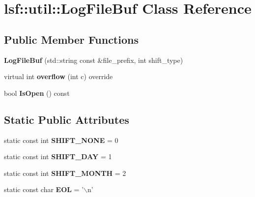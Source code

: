 \hypertarget{classlsf_1_1util_1_1LogFileBuf}{
\section{lsf::util::LogFileBuf Class Reference}
\label{classlsf_1_1util_1_1LogFileBuf}
}
\subsection*{Public Member Functions}
\begin{DoxyCompactItemize}
\item 
\hypertarget{classlsf_1_1util_1_1LogFileBuf_a99668a3f8bcb7db5b4b24c812bbdcc67}{
{\bfseries LogFileBuf} (std::string const \&file\_\-prefix, int shift\_\-type)}
\label{classlsf_1_1util_1_1LogFileBuf_a99668a3f8bcb7db5b4b24c812bbdcc67}

\item 
\hypertarget{classlsf_1_1util_1_1LogFileBuf_a124a4185f6860c7ab77e25da1aea7b3a}{
virtual int {\bfseries overflow} (int c) override}
\label{classlsf_1_1util_1_1LogFileBuf_a124a4185f6860c7ab77e25da1aea7b3a}

\item 
\hypertarget{classlsf_1_1util_1_1LogFileBuf_a507c59acfef18c258aeb8e95635c540a}{
bool {\bfseries IsOpen} () const }
\label{classlsf_1_1util_1_1LogFileBuf_a507c59acfef18c258aeb8e95635c540a}

\end{DoxyCompactItemize}
\subsection*{Static Public Attributes}
\begin{DoxyCompactItemize}
\item 
\hypertarget{classlsf_1_1util_1_1LogFileBuf_a477cf95a4b4d7ebc5f382a2376872876}{
static const int {\bfseries SHIFT\_\-NONE} = 0}
\label{classlsf_1_1util_1_1LogFileBuf_a477cf95a4b4d7ebc5f382a2376872876}

\item 
\hypertarget{classlsf_1_1util_1_1LogFileBuf_aa81bfc6f81b41b0a49d372c9eaa3a061}{
static const int {\bfseries SHIFT\_\-DAY} = 1}
\label{classlsf_1_1util_1_1LogFileBuf_aa81bfc6f81b41b0a49d372c9eaa3a061}

\item 
\hypertarget{classlsf_1_1util_1_1LogFileBuf_a096457df6221763a13e9c72ee9c4a702}{
static const int {\bfseries SHIFT\_\-MONTH} = 2}
\label{classlsf_1_1util_1_1LogFileBuf_a096457df6221763a13e9c72ee9c4a702}

\item 
\hypertarget{classlsf_1_1util_1_1LogFileBuf_aa6000aecbd30b6b85f44ef83fa758a3b}{
static const char {\bfseries EOL} = '$\backslash$n'}
\label{classlsf_1_1util_1_1LogFileBuf_aa6000aecbd30b6b85f44ef83fa758a3b}

\end{DoxyCompactItemize}

